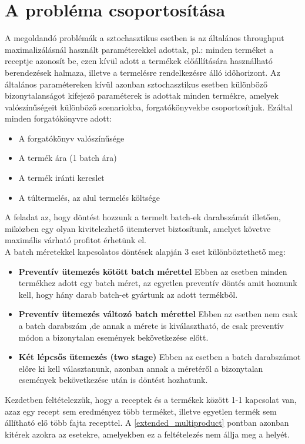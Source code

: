 \section{A probléma csoportosítása} \label{problem_csop}
A megoldandó problémák a sztochasztikus esetben is az általános throughput maximalizálásnál használt paraméterekkel adottak, pl.: minden terméket a receptje azonosít be, ezen kívül adott a termékek előállítására használható berendezések halmaza, illetve a termelésre rendelkezésre álló időhorizont. Az általános paramétereken kívül azonban sztochasztikus esetben különböző bizonytalanságot kifejező paraméterek is adottak minden termékre, amelyek valószínűségeit különböző scenariokba, forgatókönyvekbe csoportosítjuk. Ezáltal minden forgatókönyvre adott: 
\begin{itemize}
\item{A forgatókönyv valószínűsége}
\item{A termék ára (1 batch ára)}
\item{A termék iránti kereslet}
\item{A túltermelés, az alul termelés költsége}
\end{itemize}
A feladat az, hogy döntést hozzunk a termelt batch-ek darabszámát illetően, miközben egy olyan kivitelezhető ütemtervet biztosítunk, amelyet követve maximális várható profitot érhetünk el.\\
A batch méretekkel kapcsolatos döntések alapján 3 eset különböztethető meg:
\begin{itemize}
\item \textbf{Preventív ütemezés kötött batch mérettel} Ebben az esetben minden termékhez adott egy batch méret, az egyetlen preventív döntés amit hoznunk kell, hogy hány darab batch-et gyártunk az adott termékből.
\item \textbf{Preventív ütemezés változó batch mérettel} Ebben az esetben nem csak a batch darabszám ,de annak a mérete is kiválasztható, de csak preventív módon a bizonytalan események bekövetkezése előtt.
\item \textbf{Két lépcsős ütemezés (two stage)} Ebben az esetben a batch darabszámot előre ki kell választanunk, azonban annak a méretéről a bizonytalan események bekövetkezése után is döntést hozhatunk.
\end{itemize}
Kezdetben feltételezzük, hogy a receptek és a termékek között 1-1 kapcsolat van, azaz egy recept sem eredményez több terméket, illetve egyetlen termék sem állítható elő több fajta recepttel. A \ref{extended_multiproduct} pontban azonban kitérek azokra az esetekre, amelyekben ez a feltételezés nem állja meg a helyét.
